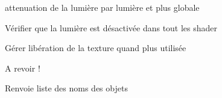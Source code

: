 
\begin{DoxyRefList}
\item[\label{todo__todo000001}%
\hypertarget{todo__todo000001}{}%
Classe \hyperlink{class_light}{Light} ]attenuation de la lumière par lumière et plus globale  
\item[\label{todo__todo000002}%
\hypertarget{todo__todo000002}{}%
Membre \hyperlink{class_light_ad0e59fad13bb6cfadc25b2c477e9ddc7}{Light\+:\+:$\sim$\+Light} ()]Vérifier que la lumière est désactivée dans tout les shader  
\item[\label{todo__todo000003}%
\hypertarget{todo__todo000003}{}%
Membre \hyperlink{class_material_a2c19452d71f54075df8f5405b03129f4}{Material\+:\+:$\sim$\+Material} ()]Gérer libération de la texture quand plus utilisée  
\item[\label{todo__todo000004}%
\hypertarget{todo__todo000004}{}%
Membre \hyperlink{class_piece_a029823aa5135b356a9e4da14578db4e8}{Piece\+:\+:get\+Children} () const ]A revoir ! \begin{DoxyReturn}{Renvoie}
liste des noms des objets 
\end{DoxyReturn}

\end{DoxyRefList}